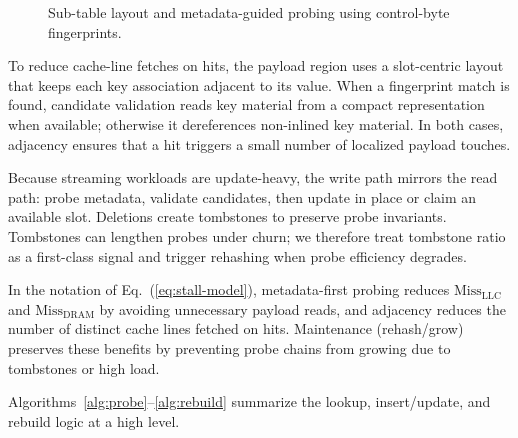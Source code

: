 \documentclass[sigconf]{acmart}
\begin{document}
\begin{figure}[t]
  \centering
  \caption{Sub-table layout and metadata-guided probing using control-byte fingerprints.}
  \label{fig:subtable-layout}
\end{figure}

To reduce cache-line fetches on hits, the payload region uses a slot-centric layout that keeps each key association adjacent to its value. When a fingerprint match is found, candidate validation reads key material from a compact representation when available; otherwise it dereferences non-inlined key material. In both cases, adjacency ensures that a hit triggers a small number of localized payload touches.

Because streaming workloads are update-heavy, the write path mirrors the read path: probe metadata, validate candidates, then update in place or claim an available slot. Deletions create tombstones to preserve probe invariants. Tombstones can lengthen probes under churn; we therefore treat tombstone ratio as a first-class signal and trigger rehashing when probe efficiency degrades.

In the notation of Eq.~(\ref{eq:stall-model}), metadata-first probing reduces $\mathrm{Miss}_{\mathrm{LLC}}$ and $\mathrm{Miss}_{\mathrm{DRAM}}$ by avoiding unnecessary payload reads, and adjacency reduces the number of distinct cache lines fetched on hits. Maintenance (rehash/grow) preserves these benefits by preventing probe chains from growing due to tombstones or high load.

Algorithms~\ref{alg:probe}--\ref{alg:rebuild} summarize the lookup, insert/update, and rebuild logic at a high level.
\end{document}
